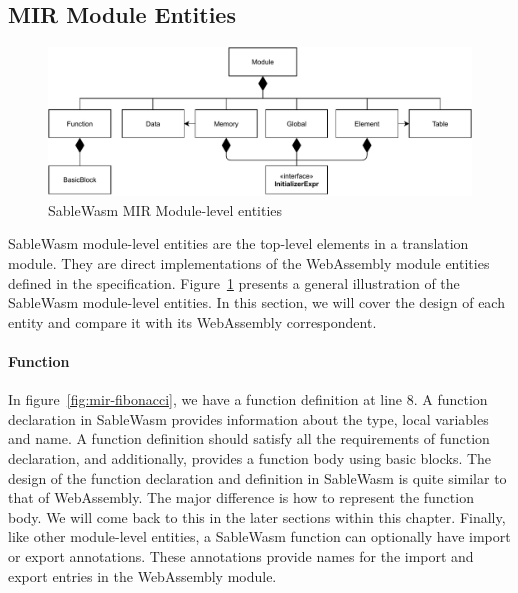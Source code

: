 \subsection{MIR Module Entities}

\begin{figure}
  \centering
  \includegraphics[width=\textwidth]{Images/4.MIR/module.pdf}
  \caption{SableWasm MIR Module-level entities}
  \label{fig:sablewasm-mir-module}
\end{figure}

SableWasm module-level entities are the top-level elements in a translation
module. They are direct implementations of the WebAssembly module entities
defined in the specification. Figure~\ref{fig:sablewasm-mir-module} presents a
general illustration of the SableWasm module-level entities. In this section,
we will cover the design of each entity and compare it with its WebAssembly
correspondent.

\paragraph{Function}
In figure~\ref{fig:mir-fibonacci}, we have a function definition at line 8. A
function declaration in SableWasm provides information about the type, local
variables and name. A function definition should satisfy all the requirements of
function declaration, and additionally, provides a function body using basic
blocks. The design of the function declaration and definition in SableWasm is
quite similar to that of WebAssembly. The major difference is how to represent
the function body. We will come back to this in the later sections within this
chapter. Finally, like other module-level entities, a SableWasm function can
optionally have import or export annotations. These annotations provide names
for the import and export entries in the WebAssembly module.

